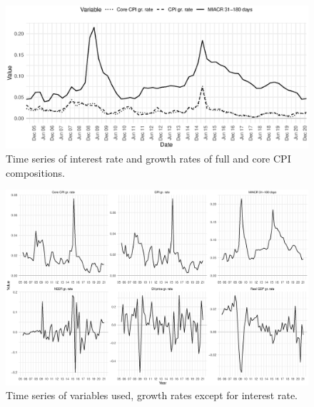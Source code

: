 \documentclass{beamer}
\begin{document}
\begin{frame}[noframenumbering]
	\label{intrate_cpi}
	\begin{figure}[h!]
		\centering
		\includegraphics[width=1\linewidth]{../Text/figures/intrate_cpi}
		\caption[]{Time series of interest rate and growth rates of full and core CPI compositions.}
		\label{fig:intrate_cpi}
	\end{figure}
\end{frame}

\begin{frame}[noframenumbering]
	\label{time_series}
	\begin{figure}[h!]
		\centering
		\includegraphics[width=1\linewidth]{../Text/figures/time_series}
		\caption[]{Time series of variables used, growth rates except for interest rate.}
		\label{fig:time_series}
	\end{figure}
\end{frame}
\end{document}
